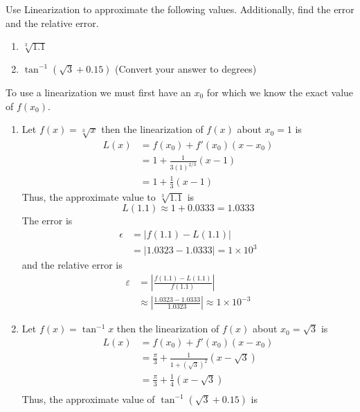 \documentclass{hwset}
\date{13 April 2011}
\begin{document}
\begin{problem}[1.]
	Use Linearization to approximate the following values. Additionally, find
	the error and the relative error.
	\begin{enumerate}
		\item $\sqrt[3]{1.1}$
		\item $\tan^{-1} (\sqrt{3} + 0.15)$ (Convert your answer to degrees)
	\end{enumerate}
\end{problem}

\begin{solution}
	To use a linearization we must first have an $x_0$ for which we know the exact
	value of $f(x_0)$.
	\begin{enumerate}
		\item Let $f(x) = \sqrt[3]{x}$ then the linearization of $f(x)$ about $x_0 =
			1$ is
			\begin{align*}
				L(x) &= f(x_0) + f'(x_0)(x-x_0) \\
				&= 1 + \frac{1}{3 (1)^{2/3}}(x-1) \\
				&= 1 + \frac{1}{3}(x-1) 
			\end{align*}
			Thus, the approximate value to $\sqrt[3]{1.1}$ is 
			\begin{equation*}
				L(1.1) \approx 1 + 0.0333 = \boxed{1.0333}
			\end{equation*}
			The error is 
			\begin{align*}
				\epsilon &= |f(1.1) - L(1.1)|\\
				&= |1.0323 - 1.0333| = \boxed{1\times 10^{3}}
			\end{align*}
			and the relative error is
			\begin{align*}
				\varepsilon &= \left|\frac{f(1.1) - L(1.1)}{f(1.1)}\right|\\
				&\approx \left|\frac{1.0323 - 1.0333}{1.0323}\right| \approx
				\boxed{1\times 10^{-3}}
			\end{align*}
		\item Let $f(x) = \tan^{-1} x$ then the linearization of $f(x)$ about $x_0 =
			\sqrt{3}$ is
			\begin{align*}
				L(x) &= f(x_0) + f'(x_0)(x-x_0) \\
				&= \frac{\pi}{3} + \frac{1}{1+(\sqrt{3})^2}(x-\sqrt{3}) \\
				&= \frac{\pi}{3} + \frac{1}{4}(x-\sqrt{3}) \\
			\end{align*}
			Thus, the approximate value of $\tan^{-1} (\sqrt{3} + 0.15)$ is 

\end{enumerate}
\end{solution}
\end{document}

